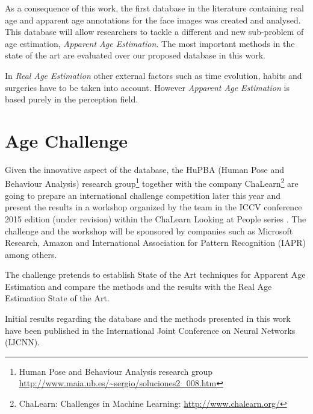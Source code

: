 As a consequence of this work, the first database in the literature containing real age and apparent age annotations for the face images was created and analysed. This database will allow researchers to tackle a different and new sub-problem of age estimation, \textit{Apparent Age Estimation}. The most important methods in the state of the art are evaluated over our proposed database in this work.

In \textit{Real Age Estimation} other external factors such as time evolution, habits and surgeries have to be taken into account. However \textit{Apparent Age Estimation} is based purely in the perception field.


\section{Age Challenge}

Given the innovative aspect of the database, the HuPBA (Human Pose and Behaviour Analysis) research group\footnote{Human Pose and Behaviour Analysis research group\\ \url{http://www.maia.ub.es/~sergio/soluciones2_008.htm}} together with the company ChaLearn\footnote{ChaLearn: Challenges in Machine Learning: \url{http://www.chalearn.org/}} are going to prepare an international challenge competition later this year and present the results in a workshop organized by the team in the ICCV conference 2015 edition (under revision) within the ChaLearn Looking at People series \cite{LaP} \cite{SergioEscalera2014} \cite{Escalera:2013:MGR:2522848.2532595} \cite{conf/icmi/EscaleraGBRGAESASBS13}. The challenge and the workshop will be sponsored by companies such as Microsoft Research, Amazon and International Association for Pattern Recognition (IAPR) among others.

The challenge pretends to establish State of the Art techniques for Apparent Age Estimation and compare the methods and the results with the Real Age Estimation State of the Art.

Initial results regarding the database and the methods presented in this work have been published in the International Joint Conference on Neural Networks (IJCNN).


